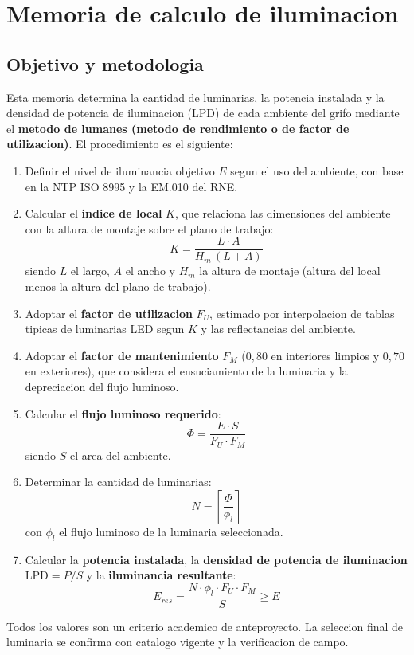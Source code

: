 \chapter{Memoria de calculo de iluminacion}

\section{Objetivo y metodologia}
Esta memoria determina la cantidad de luminarias, la potencia instalada y la
densidad de potencia de iluminacion (LPD) de cada ambiente del grifo mediante
el \textbf{metodo de lumanes (metodo de rendimiento o de factor de
utilizacion)}. El procedimiento es el siguiente:

\begin{enumerate}
\item Definir el nivel de iluminancia objetivo \(E\) segun el uso del ambiente,
  con base en la NTP ISO 8995 y la EM.010 del RNE.
\item Calcular el \textbf{indice de local} \(K\), que relaciona las
  dimensiones del ambiente con la altura de montaje sobre el plano de trabajo:
  \[
    K = \frac{L \cdot A}{H_m\,(L + A)}
  \]
  siendo \(L\) el largo, \(A\) el ancho y \(H_m\) la altura de montaje
  (altura del local menos la altura del plano de trabajo).
\item Adoptar el \textbf{factor de utilizacion} \(F_U\), estimado por
  interpolacion de tablas tipicas de luminarias LED segun \(K\) y las
  reflectancias del ambiente.
\item Adoptar el \textbf{factor de mantenimiento} \(F_M\) (\(0,80\) en
  interiores limpios y \(0,70\) en exteriores), que considera el ensuciamiento
  de la luminaria y la depreciacion del flujo luminoso.
\item Calcular el \textbf{flujo luminoso requerido}:
  \[
    \Phi = \frac{E \cdot S}{F_U \cdot F_M}
  \]
  siendo \(S\) el area del ambiente.
\item Determinar la cantidad de luminarias:
  \[
    N = \left\lceil \frac{\Phi}{\phi_l} \right\rceil
  \]
  con \(\phi_l\) el flujo luminoso de la luminaria seleccionada.
\item Calcular la \textbf{potencia instalada}, la \textbf{densidad de potencia
  de iluminacion} \(\text{LPD} = P/S\) y la \textbf{iluminancia resultante}:
  \[
    E_{res} = \frac{N \cdot \phi_l \cdot F_U \cdot F_M}{S} \geq E
  \]
\end{enumerate}

Todos los valores son un criterio academico de anteproyecto. La seleccion
final de luminaria se confirma con catalogo vigente y la verificacion de campo.

